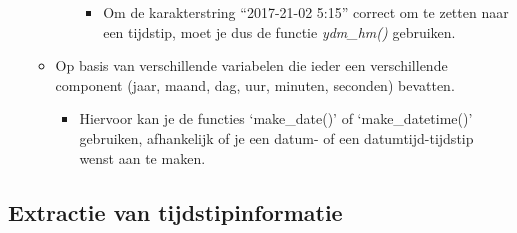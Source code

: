 \documentclass[]{memoir}
\providecommand{\tightlist}{%
  \setlength{\itemsep}{0pt}\setlength{\parskip}{0pt}}
\begin{document}
\begin{itemize}
\begin{itemize}
\begin{itemize}
      \begin{itemize}
      \tightlist
      \item
        Om de karakterstring ``2017-21-02 5:15'' correct om te zetten
        naar een tijdstip, moet je dus de functie \emph{ydm\_hm()}
        gebruiken.
      \end{itemize}
    \end{itemize}
  \item
    Op basis van verschillende variabelen die ieder een verschillende
    component (jaar, maand, dag, uur, minuten, seconden) bevatten.

    \begin{itemize}
    \tightlist
    \item
      Hiervoor kan je de functies `make\_date()' of `make\_datetime()'
      gebruiken, afhankelijk of je een datum- of een datumtijd-tijdstip
      wenst aan te maken.
    \end{itemize}
  \end{itemize}
\end{itemize}

\subsection{Extractie van
tijdstipinformatie}\label{extractie-van-tijdstipinformatie}
\end{document}
